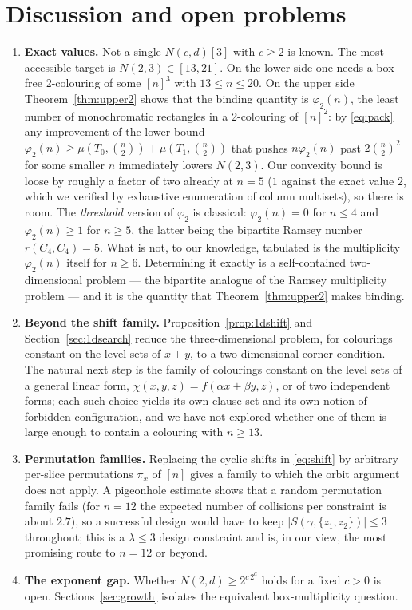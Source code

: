 \documentclass[11pt]{article}
\theoremstyle{definition}
\newcommand{\Ncd}{N(c,d)}
\begin{document}
\section{Discussion and open problems}

\begin{enumerate}[label=(\arabic*)]
\item \textbf{Exact values.} Not a single $\Ncd[3]$ with $c\ge2$ is known. The most
  accessible target is $N(2,3)\in[13,21]$. On the lower side one needs a box-free
  2-colouring of some $[n]^3$ with $13\le n\le20$. On the upper side Theorem~\ref{thm:upper2}
  shows that the binding quantity is $\varphi_2(n)$, the least number of monochromatic
  rectangles in a 2-colouring of $[n]^2$: by \eqref{eq:pack} any improvement of the lower
  bound $\varphi_2(n)\ge\mu(T_0,\binom{n}{2})+\mu(T_1,\binom{n}{2})$ that pushes
  $n\varphi_2(n)$ past $2\binom{n}{2}^2$ for some smaller $n$ immediately lowers
  $N(2,3)$. Our convexity bound is loose by roughly a factor of two already at $n=5$
  ($1$ against the exact value $2$, which we verified by exhaustive enumeration of column
  multisets), so there is room. The \emph{threshold} version of $\varphi_2$ is classical:
  $\varphi_2(n)=0$ for $n\le4$ and $\varphi_2(n)\ge1$ for $n\ge5$, the latter being the
  bipartite Ramsey number $r(C_4,C_4)=5$. What is not, to our knowledge, tabulated is the
  multiplicity $\varphi_2(n)$ itself for $n\ge6$. Determining it exactly is a
  self-contained two-dimensional problem --- the bipartite analogue of the Ramsey
  multiplicity problem --- and it is the quantity that Theorem~\ref{thm:upper2} makes
  binding.
\item \textbf{Beyond the shift family.} Proposition~\ref{prop:1dshift} and
  Section~\ref{sec:1dsearch} reduce the three-dimensional problem, for colourings constant
  on the level sets of $x+y$, to a two-dimensional corner condition. The natural next step
  is the family of colourings constant on the level sets of a general linear form,
  $\chi(x,y,z)=f(\alpha x+\beta y,z)$, or of two independent forms; each such choice
  yields its own clause set and its own notion of forbidden configuration, and we have not
  explored whether one of them is large enough to contain a colouring with $n\ge13$.
\item \textbf{Permutation families.} Replacing the cyclic shifts in \eqref{eq:shift} by
  arbitrary per-slice permutations $\pi_x$ of $[n]$ gives a family to which the orbit
  argument does not apply. A pigeonhole estimate shows that a random permutation family
  fails (for $n=12$ the expected number of collisions per constraint is about $2.7$), so
  a successful design would have to keep $|S(\gamma,\{z_1,z_2\})|\le3$ throughout; this is
  a $\lambda\le3$ design constraint and is, in our view, the most promising route to
  $n=12$ or beyond.
\item \textbf{The exponent gap.} Whether $N(2,d)\ge2^{c\,2^d}$ holds for a fixed $c>0$ is
  open. Sections~\ref{sec:growth} isolates the equivalent box-multiplicity question.
\end{enumerate}
\end{document}
